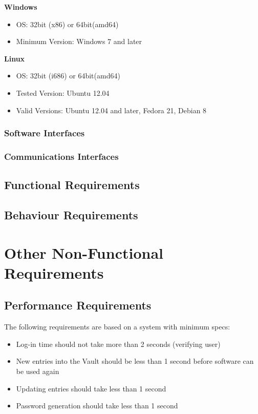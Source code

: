 \documentclass[11pt]{report}
\begin{document}
\textbf{Windows}
\begin{itemize}
    \item OS: 32bit (x86) or 64bit(amd64)
    \item Minimum Version: Windows 7 and later
\end{itemize}

\textbf{Linux}
\begin{itemize}
    \item OS: 32bit (i686) or 64bit(amd64)
    \item Tested Version: Ubuntu 12.04 
    \item Valid Versions: Ubuntu 12.04 and later, Fedora 21, Debian 8
\end{itemize}


\subsection{Software Interfaces}

\subsection{Communications Interfaces}

\section{Functional Requirements}

\section{Behaviour Requirements}




\chapter{Other Non-Functional Requirements}

\section{Performance Requirements}
The following requirements are based on a system with minimum specs:
\begin{itemize}
    \item Log-in time should not take more than 2 seconds (verifying user)
    \item New entries into the Vault should be less than 1 second before software can be used again
    \item Updating entries should take less than 1 second
    \item Password generation should take less than 1 second
\end{itemize}
\end{document}
